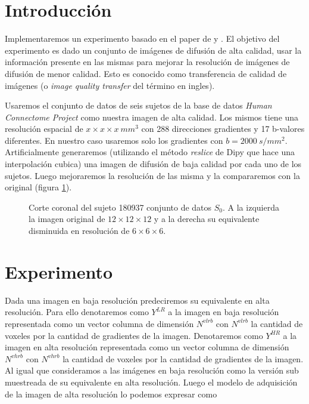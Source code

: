 \documentclass[a4paper,10pt]{article}%
\title{}
\author{Leonel Exequiel Gómez}
\begin{document}
\maketitle



\section{Introducción}
Implementaremos un experimento basado en el paper de \citet{Alexander2014} y \citet{Ning2016}. 
El objetivo del experimento es dado un conjunto de imágenes de difusión de 
alta calidad, usar la información presente en las mismas para mejorar la 
resolución de imágenes de difusión de menor calidad. Esto es conocido como 
transferencia de calidad de imágenes (o \textit{image quality transfer} del 
término en ingles). 

Usaremos el conjunto de datos de seis sujetos de la base de datos \textit{Human Connectome Project} como nuestra imagen 
de alta calidad. Los mismos tiene una resolución espacial de $x\times x\times x\ mm^3$ con 288 direcciones 
gradientes y 17 b-valores diferentes. En nuestro caso usaremos solo los gradientes con $b=2000\ s/mm^2$. 
Artificialmente generaremos (utilizando el m\'etodo \textit{reslice} de Dipy que hace una interpolación cubica) una 
imagen de difusión de baja calidad por cada uno de los sujetos. Luego mejoraremos la resolución de las misma y la 
compararemos con la original (figura \ref{hr_vs_lr_input}).


\begin{figure}[h]
\caption{Corte coronal del sujeto 180937 conjunto de datos $S_0$. A la izquierda la imagen 
original de $12\times12\times12$ y a la derecha su equivalente disminuida en 
resolución de $6\times6\times6$.} 
\label{hr_vs_lr_input}
\end{figure}%



\section{Experimento}

Dada una imagen en baja resolución predeciremos su equivalente en alta 
resolución. Para ello denotaremos como $Y^{LR}$ a la imagen en baja resolución 
representada como un vector columna de dimensión $N^{vlrb}$ con $N^{vlrb}$ la 
cantidad de voxeles por la cantidad de gradientes de la imagen. Denotaremos 
como $Y^{HR}$ a la imagen en alta resolución representada como un vector 
columna de dimensión $N^{vhrb}$ con $N^{vhrb}$ la cantidad de voxeles por la 
cantidad de gradientes de la imagen. Al igual que \citep{Ning2016} consideramos 
a las imágenes en baja resolución como la versión sub muestreada de su 
equivalente en alta resolución. Luego el modelo de adquisición de la imagen de 
alta resolución lo podemos expresar como
\end{document}
